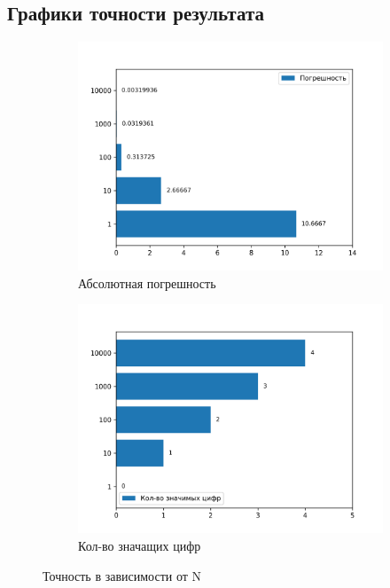 \documentclass[a4paper,12pt]{article}
\newenvironment{longlisting}{\captionsetup{type=listing}}{}
\begin{document}
\begin{longlisting}
\inputminted{python}{series.py}
\end{longlisting}

\subsection{Графики точности результата}
\begin{figure}[H]
\centering
\begin{subfigure}{.5\textwidth}
  \centering
  \includegraphics[width=\linewidth]{plots/series_error.png}
  \caption{Абсолютная погрешность}
  \label{fig:sub1}
\end{subfigure}%
\begin{subfigure}{.5\textwidth}
  \centering
  \includegraphics[width=\linewidth]{plots/series_n_digits.png}
  \caption{Кол-во значащих цифр}
  \label{fig:sub2}
\end{subfigure}
\caption{Точность в зависимости от N}
\label{fig:test}
\end{figure}
\end{document}
